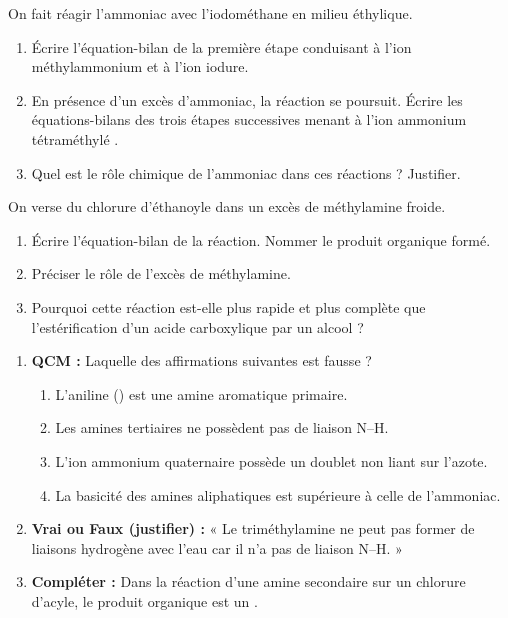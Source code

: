 \documentclass[11pt]{article}
\begin{document}
\begin{exercice}
On fait réagir l'ammoniac  avec l'iodométhane  en milieu éthylique.
\begin{enumerate}
    \item Écrire l'équation-bilan de la première étape conduisant à l'ion méthylammonium  et à l'ion iodure.
    \item En présence d'un excès d'ammoniac, la réaction se poursuit. Écrire les équations-bilans des trois étapes successives menant à l'ion ammonium tétraméthylé .
    \item Quel est le rôle chimique de l'ammoniac dans ces réactions ? Justifier.
\end{enumerate}
\end{exercice}

\begin{exercice}
On verse du chlorure d'éthanoyle  dans un excès de méthylamine  froide.
\begin{enumerate}
    \item Écrire l'équation-bilan de la réaction. Nommer le produit organique formé.
    \item Préciser le rôle de l'excès de méthylamine.
    \item Pourquoi cette réaction est-elle plus rapide et plus complète que l'estérification d'un acide carboxylique par un alcool ?
\end{enumerate}
\end{exercice}

\begin{exercice}
\begin{enumerate}
    \item \textbf{QCM :} Laquelle des affirmations suivantes est fausse ?
    \begin{enumerate}
        \item L'aniline () est une amine aromatique primaire.
        \item Les amines tertiaires ne possèdent pas de liaison N--H.
        \item L'ion ammonium quaternaire  possède un doublet non liant sur l'azote.
        \item La basicité des amines aliphatiques est supérieure à celle de l'ammoniac.
    \end{enumerate}
    \item \textbf{Vrai ou Faux (justifier) :} « Le triméthylamine  ne peut pas former de liaisons hydrogène avec l'eau car il n'a pas de liaison N--H. »
    \item \textbf{Compléter :} Dans la réaction d'une amine secondaire sur un chlorure d'acyle, le produit organique est un \underline{\hspace{4cm}}.
\end{enumerate}
\end{exercice}
\end{document}
